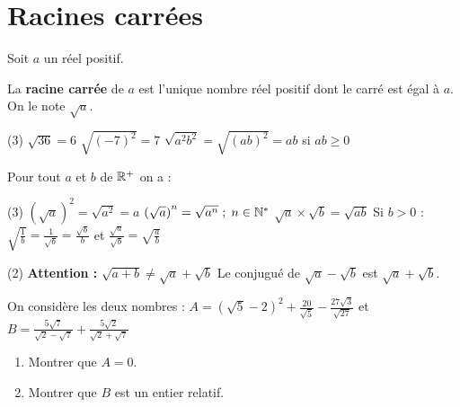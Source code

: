 \documentclass[10pt, a4paper]{article}
\begin{document}
\section{Racines carrées }

\begin{Definition}
Soit $a$ un réel positif.

La \textbf{racine carrée} de $a$ est l'unique nombre réel positif dont le carré est égal à $a$. On le note $\sqrt{a}$.
\end{Definition}

\begin{Exemple}[][5 min]
\begin{tasks}[label=$\bullet$, label-width=5pt, item-indent=15pt](3)
\task $\sqrt{36} = 6$
\task $\sqrt{(-7)^2} = 7$
\task $\sqrt{a^2b^2} = \sqrt{(ab)^2} = ab$ \; si $ab \geq 0$
\end{tasks}
\end{Exemple}



\begin{Propriete}
Pour tout $a$ et $b$ de $\mathbb{R}^{+}$ on a :
\vspace{0.2cm}
\begin{tasks}[label=$\bullet$, label-width=5pt, item-indent=15pt](3)
\task $\left(\sqrt{a}\right)^{2}=\sqrt{a^{2}}=a$
\task $\left(\sqrt{a}\right)^{n}=\sqrt{a^{n}} \;;\; n\in\mathbb{N}^{*}$
\task $\sqrt{a}\times\sqrt{b}=\sqrt{ab}$
\task* Si $b>0$ : $\sqrt{\frac{1}{b}}=\frac{1}{\sqrt{b}}=\frac{\sqrt{b}}{b}$ \quad et \quad $\frac{\sqrt{a}}{\sqrt{b}}=\sqrt{\frac{a}{b}}$
\end{tasks}
\end{Propriete}


\begin{Remarque}
\begin{tasks}[label=$\bullet$, label-width=5pt, item-indent=15pt](2)
\task \textbf{Attention :} $\sqrt{a+b}\neq\sqrt{a}+\sqrt{b}$
\task Le conjugué de $\sqrt{a}-\sqrt{b}$ est $\sqrt{a}+\sqrt{b}$.
\end{tasks}
\end{Remarque}

\begin{Application}[][15 min]
On considère les deux nombres :
$A = (\sqrt{5} - 2)^2 + \frac{20}{\sqrt{5}} - \frac{27\sqrt{3}}{\sqrt{27}}$ \quad et \quad
$B = \frac{5\sqrt{7}}{\sqrt{2} - \sqrt{7}} + \frac{5\sqrt{2}}{\sqrt{2} + \sqrt{7}}$
\begin{enumerate}
    \item Montrer que $A=0$.
    \item Montrer que $B$ est un entier relatif.
\end{enumerate}





\end{Application}
\end{document}
